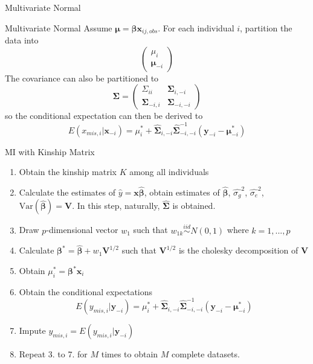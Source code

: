 \documentclass [aspectratio=169]{beamer}
\begin{document}
\begin{frame}{Multivariate Normal}
    \begin{block}{Multivariate Normal}
        Assume $\boldsymbol{\mu}=\boldsymbol{\beta}\mathbf{x}_{ij,obs}$. For each individual $i$, partition the data into 
        \begin{equation*}
        \begin{pmatrix} 
            \mu_i \\
            \boldsymbol{\mu}_{-i}
        \end{pmatrix}
    \end{equation*}
    The covariance can also be partitioned to 
    \begin{equation*} 
        \boldsymbol{\Sigma}=
        \begin{pmatrix} 
            \Sigma_{ii} & \boldsymbol{\Sigma}_{i,-i} \\
            \boldsymbol{\Sigma}_{-i,i} & \boldsymbol{\Sigma}_{-i,-i}
        \end{pmatrix}
    \end{equation*}
    so the conditional expectation can then be derived to 
    \begin{equation} 
        E(x_{mis,i}|\mathbf{x}_{-i})=\mu_i^*+\hat{\boldsymbol{\Sigma}}_{i,-i}\hat{\boldsymbol{\Sigma}}_{-i,-i}^{-1}(\mathbf{y}_{-i}-\boldsymbol{\mu}^*_{-i})
    \end{equation}
    \end{block}
\end{frame}

\begin{frame}{MI with Kinship Matrix}
    \begin{enumerate}
        \item Obtain the kinship matrix $K$ among all individuals 
        \item Calculate the estimates of $\hat{y}=\mathbf{x}\hat{\boldsymbol{\beta}}$, obtain estimates of $\hat{\boldsymbol{\beta}}$, $\hat{\sigma_g}^2$, $\hat{\sigma_e}^2$, $\text{Var}(\hat{\boldsymbol{\beta}})=\mathbf{V}$. In this step, naturally, $\boldsymbol{\hat{\Sigma}}$ is obtained.
        \item Draw $p$-dimensional vector $w_1$ such that $w_{1k}\stackrel{iid}{\sim} N(0,1)$ where $k=1,...,p$
        \item Calculate $\boldsymbol{\beta}^*=\hat{\boldsymbol{\beta}}+w_1\mathbf{V}^{1/2}$ such that $\mathbf{V}^{1/2}$ is the cholesky decomposition of $\mathbf{V}$
        \item Obtain $\mu_i^*=\boldsymbol{\beta}^*\mathbf{x}_i$
        \item Obtain the conditional expectations 
        \begin{equation}
            E(y_{mis,i}|\mathbf{y}_{-i})=\mu_i^*+\hat{\boldsymbol{\Sigma}}_{i,-i}\hat{\boldsymbol{\Sigma}}_{-i,-i}^{-1}(\mathbf{y}_{-i}-\boldsymbol{\mu}^*_{-i})
        \end{equation}
        \item Impute $y_{mis,i}=E(y_{mis,i}|\mathbf{y}_{-i})$
        \item Repeat 3. to 7. for $M$ times to obtain $M$ complete datasets.
    \end{enumerate}
\end{frame}
\end{document}

